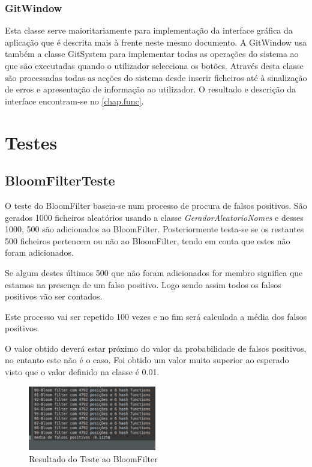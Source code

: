 \documentclass{report}
\begin{document}
\subsection{GitWindow}
Esta classe serve maioritariamente para implementação da interface gráfica da aplicação que é descrita mais à frente neste mesmo documento. A GitWindow usa também a classe GitSystem para implementar todas as operações do sistema ao que são executadas quando o utilizador selecciona os botões. Através desta classe são processadas todas as acções do sistema desde inserir ficheiros até à sinalização de erros e apresentação de informação ao utilizador. O resultado e descrição da interface encontram-se no \autoref{chap.func}.






\chapter{Testes}
\label{chap.test}

\section{BloomFilterTeste}
O teste do BloomFilter baseia-se num processo de procura de falsos positivos. São gerados 1000 ficheiros aleatórios usando a classe {\itshape GeradorAleatorioNomes} e desses 1000, 500 são adicionados ao BloomFilter. Posteriormente testa-se se os restantes 500 ficheiros pertencem ou não ao BloomFilter, tendo em conta que estes não foram adicionados. 

Se algum destes últimos 500 que não foram adicionados for membro significa que estamos na presença de um falso positivo. Logo sendo assim todos os falsos positivos vão ser contados.

Este processo vai ser repetido 100 vezes e no fim será calculada a média dos falsos positivos.

O valor obtido deverá estar próximo do valor da probabilidade de falsos positivos, no entanto este não é o caso. Foi obtido um valor muito superior ao esperado visto que o valor definido na classe é 0.01.

\begin{figure}[h]
\center %
\includegraphics[height=80pt]{pfn.png}
\caption{Resultado do Teste ao BloomFilter}
\label{fig:Fig31}
\end{figure}
\end{document}

